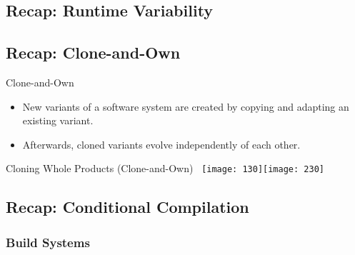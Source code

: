 
\subsection{Recap: Runtime Variability}

\subsection{Recap: Clone-and-Own}
\begin{frame}{\myframetitle}
	\begin{fancycolumns}[animation=none]
		\begin{definition}{Clone-and-Own}
			\begin{itemize}
				\item New variants of a software system are created by copying and adapting an existing variant.
				\item Afterwards, cloned variants evolve independently of each other.
			\end{itemize}	
		\end{definition}	
		\vspace{3mm}		
		\begin{example}{Cloning Whole Products (Clone-and-Own)}
			~\hfill\texttt{[image: 130]}\hfill\texttt{[image: 230]}\hfill~
		\end{example}
	\nextcolumn
	\end{fancycolumns}
\end{frame}

\subsection{Recap: Conditional Compilation}

\subsubsection*{Build Systems}

